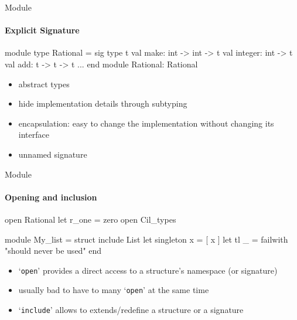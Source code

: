 \begin{frame}[fragile]{Module}
  \framesubtitle{Explicit Signature}

  \begin{ocamlcode}
module type Rational = sig
  type t
  val make: int -> int -> t
  val integer: int -> t
  val add: t -> t -> t
  ...
end
module Rational: Rational
  \end{ocamlcode}

  \begin{itemize}
  \item abstract types
  \item hide implementation details through subtyping
  \item encapsulation: easy to change the implementation without
    changing its interface
  \item unnamed signature
  \end{itemize}

\end{frame}




\begin{frame}[fragile]{Module}
  \framesubtitle{Opening and inclusion}

  \begin{ocamlcode}
open Rational
let r_one = zero
open Cil_types

module My_list = struct
  include List
  let singleton x = [ x ]
  let tl _ = failwith "should never be used"
end
  \end{ocamlcode}

  \begin{itemize}
  \item `\lstinline+open+' provides a direct access to a structure's namespace
    (or signature)
  \item usually bad to have to many `\lstinline+open+' at the same time
  \item `\lstinline+include+' allows to extends/redefine a structure or a
    signature
  \end{itemize}

\end{frame}

